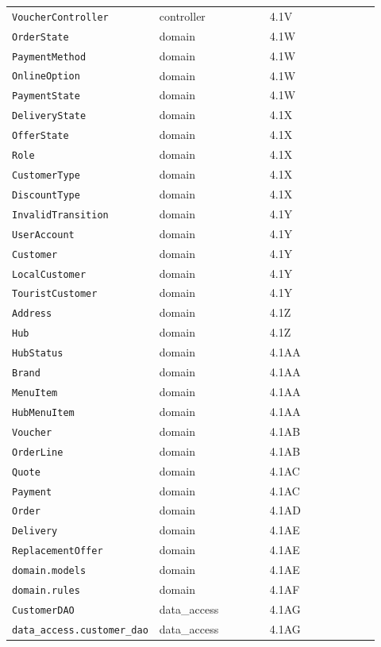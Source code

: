 \begin{longtable}{>{\raggedright\arraybackslash}p{0.3067\linewidth}>{\raggedright\arraybackslash}p{0.3067\linewidth}>{\raggedright\arraybackslash}p{0.3067\linewidth}}
\texttt{VoucherController} & controller & 4.1V \\
\texttt{OrderState} & domain & 4.1W \\
\texttt{PaymentMethod} & domain & 4.1W \\
\texttt{OnlineOption} & domain & 4.1W \\
\texttt{PaymentState} & domain & 4.1W \\
\texttt{DeliveryState} & domain & 4.1X \\
\texttt{OfferState} & domain & 4.1X \\
\texttt{Role} & domain & 4.1X \\
\texttt{CustomerType} & domain & 4.1X \\
\texttt{DiscountType} & domain & 4.1X \\
\texttt{InvalidTransition} & domain & 4.1Y \\
\texttt{UserAccount} & domain & 4.1Y \\
\texttt{Customer} & domain & 4.1Y \\
\texttt{LocalCustomer} & domain & 4.1Y \\
\texttt{TouristCustomer} & domain & 4.1Y \\
\texttt{Address} & domain & 4.1Z \\
\texttt{Hub} & domain & 4.1Z \\
\texttt{HubStatus} & domain & 4.1AA \\
\texttt{Brand} & domain & 4.1AA \\
\texttt{MenuItem} & domain & 4.1AA \\
\texttt{HubMenuItem} & domain & 4.1AA \\
\texttt{Voucher} & domain & 4.1AB \\
\texttt{OrderLine} & domain & 4.1AB \\
\texttt{Quote} & domain & 4.1AC \\
\texttt{Payment} & domain & 4.1AC \\
\texttt{Order} & domain & 4.1AD \\
\texttt{Delivery} & domain & 4.1AE \\
\texttt{ReplacementOffer} & domain & 4.1AE \\
\texttt{domain.\allowbreak{}models} & domain & 4.1AE \\
\texttt{domain.\allowbreak{}rules} & domain & 4.1AF \\
\texttt{CustomerDAO} & data\_access & 4.1AG \\
\texttt{data\_\allowbreak{}access.\allowbreak{}customer\_\allowbreak{}dao} & data\_access & 4.1AG \\

\end{longtable}
